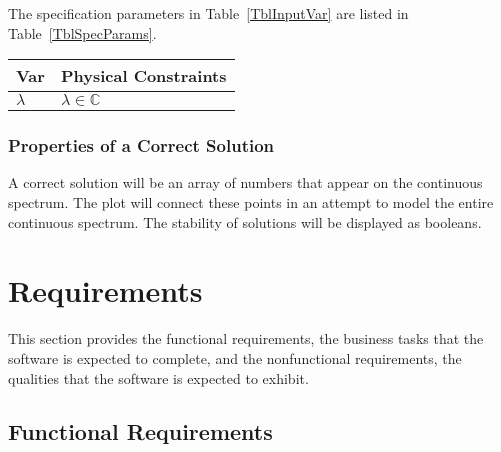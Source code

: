 \documentclass[12pt]{article}
\begin{document}
The specification parameters in Table~\ref{TblInputVar} are listed in
Table~\ref{TblSpecParams}.

\begin{table}[!h]
\caption{Output Variables} \label{TblOutputVar}
\renewcommand{\arraystretch}{1.2}
\noindent \begin{longtable*}{l l} 
  \toprule
  \textbf{Var} & \textbf{Physical Constraints} \\
  \midrule 
  $\lambda$ & $\lambda \in \mathbb{C}$ 
  \\
  \bottomrule
\end{longtable*}
\end{table}

\subsubsection{Properties of a Correct Solution} \label{sec_CorrectSolution}

\noindent
A correct solution will be an array of numbers that appear on the continuous 
spectrum. The plot will connect these points in an attempt to model the entire 
continuous spectrum. The stability of solutions will be displayed as booleans. 

\section{Requirements}

This section provides the functional requirements, the business tasks that the
software is expected to complete, and the nonfunctional requirements, the
qualities that the software is expected to exhibit.\\

 

\subsection{Functional Requirements}
\end{document}
